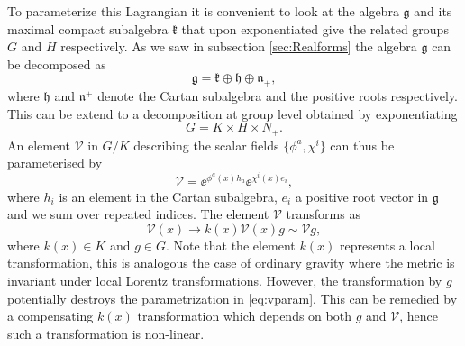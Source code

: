 To parameterize this Lagrangian it is convenient to look at the algebra $\mathfrak{g}$ and its maximal compact subalgebra $\mathfrak{k}$ that upon exponentiated give the related groups $G$ and $H$ respectively. As we saw in subsection \ref{sec:Realforms} the algebra $\mathfrak{g}$ can be decomposed as 
\begin{equation}
    \mathfrak{g} = \mathfrak{k}\oplus \mathfrak{h}\oplus\mathfrak{n}_+,
\end{equation}
where $\mathfrak{h}$ and $\mathfrak{n}^+$ denote the Cartan subalgebra and the positive roots respectively. This can be extend to a decomposition at group level obtained by exponentiating 
\begin{equation}
    G = K\times H\times N_+.
\end{equation}
An element $\mathcal{V}$ in $G/K$ describing the scalar fields $\{\phi^a,\chi^i\}$ can thus be parameterised by 
\begin{equation}\label{eq:vparam}
    \mathcal{V} = \ee^{\phi^a(x)h_a}\ee^{\chi^i(x)e_i},
\end{equation}
where $h_i$ is an element in the Cartan subalgebra, $e_i$ a positive root vector in $\mathfrak{g}$ and we sum over repeated indices. The element $\mathcal{V}$ transforms as 
\begin{equation}
    \mathcal{V}(x) \to k(x)\mathcal{V}(x)g\sim \mathcal{V}g,
\end{equation}
where $k(x)\in K$ and $g\in G$. Note that the element $k(x)$ represents a local transformation, this is analogous the case of ordinary gravity where the metric is invariant under local Lorentz transformations. However, the transformation by $g$ potentially destroys the parametrization in \eqref{eq:vparam}. This can be remedied by a compensating $k(x)$ transformation which depends on both $g$ and $\mathcal{V}$, hence such a transformation is non-linear. 



